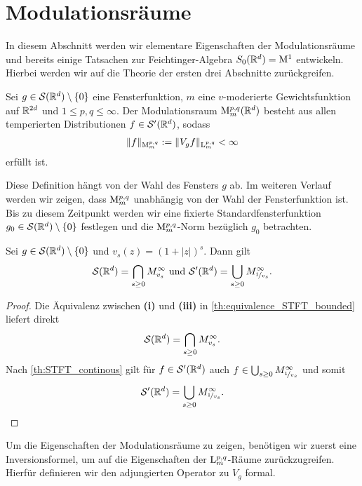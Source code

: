 \section{Modulationsräume}
In diesem Abschnitt werden wir elementare Eigenschaften der Modulationsräume und
bereits einige Tatsachen zur Feichtinger-Algebra $ S_0(\mathbb{R}^d) = \mathrm{M}^1 $ entwickeln.
Hierbei werden wir auf die Theorie der ersten drei Abschnitte zurückgreifen. 


\begin{df}
	Sei $ g \in \mathcal{S}(\mathbb{R}^d) \setminus \{ 0\}$ eine Fensterfunktion, $ m $ eine $ v $-moderierte Gewichtsfunktion auf $ \mathbb{R}^{2d} $ und $ 1 \leq p,q \leq \infty $.
	Der Modulationsraum $ \mathrm{M}^{p,q}_m (\mathbb{R}^d) $ besteht aus allen temperierten Distributionen $ f \in \mathcal{S}^\prime(\mathbb{R}^d) $, sodass
	\begin{align*}
	\| f \|_{\mathrm{M}^{p,q}_m} := \| V_g f \|_{\mathrm{L}^{p,q}_m} < \infty
	\end{align*}
	erfüllt ist.
	
\end{df}

Diese Definition hängt von der Wahl des Fensters $ g $ ab. 
Im weiteren Verlauf werden wir zeigen, dass $ \mathrm{M}^{p,q}_m $ unabhängig von der Wahl der Fensterfunktion ist.
Bis zu diesem Zeitpunkt werden wir eine fixierte Standardfensterfunktion $ g_0 \in \mathcal{S}(\mathbb{R}^d) \setminus \{ 0\} $ festlegen und die $ \mathrm{M}^{p,q}_m $-Norm bezüglich $ g_0 $ betrachten.

\begin{kor}
	Sei $ g \in \mathcal{S}(\mathbb{R}^d) \setminus \{ 0\}  $ und $ v_s(z) = (1+ |z|)^s$. Dann gilt
	\begin{align}
	\mathcal{S}(\mathbb{R}^d) =
	\bigcap \limits_{s \geq 0} M^\infty_{v_s} \ \text{und} \
	\mathcal{S}^\prime(\mathbb{R}^d) = \bigcup \limits_{s \geq 0} M^\infty_{\nicefrac{1}{v_s}}.
	\end{align}
\end{kor}

\begin{proof}
	Die Äquivalenz zwischen \textbf{(i)} und \textbf{(iii)} in \ref{th:equivalence_STFT_bounded} liefert direkt
	\begin{align*}
	\mathcal{S}(\mathbb{R}^d) =
	\bigcap \limits_{s \geq 0} M^\infty_{v_s}.
	\end{align*}
	Nach \ref{th:STFT_continous} gilt für $ f \in \mathcal{S}^\prime(\mathbb{R}^d) $ auch $ f \in \bigcup_{s \geq 0} M^\infty_{\nicefrac{1}{v_s}} $ und somit 
	\begin{align*}
	\mathcal{S}^\prime(\mathbb{R}^d) = \bigcup \limits_{s \geq 0} M^\infty_{\nicefrac{1}{v_s}}.
	\end{align*}
\end{proof}
Um die Eigenschaften der Modulationsräume zu zeigen, benötigen wir zuerst eine Inversionsformel, um auf die Eigenschaften der $ \mathrm{L}^{p,q}_m $-Räume zurückzugreifen. Hierfür definieren wir den adjungierten Operator zu $ V_g $ formal.


